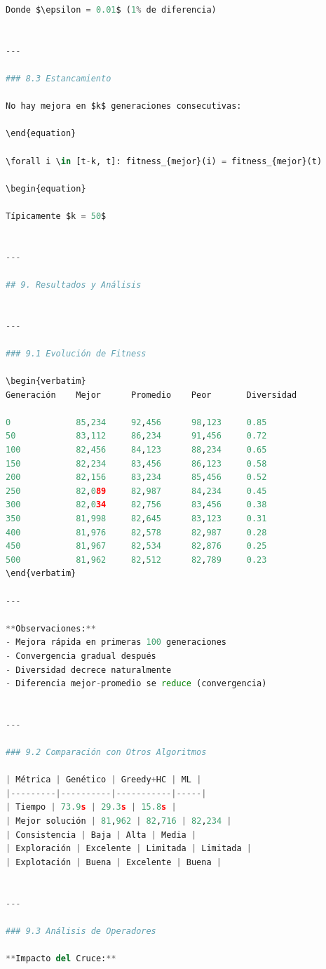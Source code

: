 \begin{itemize}
\begin{itemize}
\begin{itemize}
\begin{itemize}
\begin{itemize}
\begin{itemize}
\begin{enumerate}
\begin{enumerate}
\begin{enumerate}
\begin{enumerate}
\begin{lstlisting}[language=Python]
Donde $\epsilon = 0.01$ (1% de diferencia)


---

### 8.3 Estancamiento

No hay mejora en $k$ generaciones consecutivas:

\end{equation}

\forall i \in [t-k, t]: fitness_{mejor}(i) = fitness_{mejor}(t)

\begin{equation}

Típicamente $k = 50$


---

## 9. Resultados y Análisis


---

### 9.1 Evolución de Fitness

\begin{verbatim}
Generación    Mejor      Promedio    Peor       Diversidad

0             85,234     92,456      98,123     0.85
50            83,112     86,234      91,456     0.72
100           82,456     84,123      88,234     0.65
150           82,234     83,456      86,123     0.58
200           82,156     83,234      85,456     0.52
250           82,089     82,987      84,234     0.45
300           82,034     82,756      83,456     0.38
350           81,998     82,645      83,123     0.31
400           81,976     82,578      82,987     0.28
450           81,967     82,534      82,876     0.25
500           81,962     82,512      82,789     0.23
\end{verbatim}

---

**Observaciones:**
- Mejora rápida en primeras 100 generaciones
- Convergencia gradual después
- Diversidad decrece naturalmente
- Diferencia mejor-promedio se reduce (convergencia)


---

### 9.2 Comparación con Otros Algoritmos

| Métrica | Genético | Greedy+HC | ML |
|---------|----------|-----------|-----|
| Tiempo | 73.9s | 29.3s | 15.8s |
| Mejor solución | 81,962 | 82,716 | 82,234 |
| Consistencia | Baja | Alta | Media |
| Exploración | Excelente | Limitada | Limitada |
| Explotación | Buena | Excelente | Buena |


---

### 9.3 Análisis de Operadores

**Impacto del Cruce:**


\end{lstlisting}
\end{enumerate}
\end{enumerate}
\end{enumerate}
\end{enumerate}
\end{itemize}
\end{itemize}
\end{itemize}
\end{itemize}
\end{itemize}
\end{itemize}

